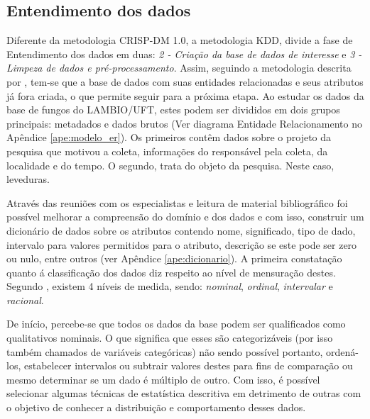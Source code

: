 \documentclass[tcc2]{classe_uftex/uftex}
\begin{document}
    \subsection{Entendimento dos dados}
    \label{subsec:entendimento_dados}
    Diferente da metodologia CRISP-DM 1.0, a metodologia KDD, divide a fase de Entendimento dos dados em duas: \emph{2 - Criação da base de dados de interesse} e \emph{3 - Limpeza de dados e pré-processamento}. Assim, seguindo a metodologia descrita por , tem-se que a base de dados com suas entidades relacionadas e seus atributos já fora criada, o que permite seguir para a próxima etapa. Ao estudar os dados da base de fungos do LAMBIO/UFT, estes podem ser divididos em dois grupos principais: metadados e dados brutos (Ver diagrama Entidade Relacionamento no Apêndice \ref{ape:modelo_er}). Os primeiros contêm dados sobre o projeto da pesquisa que motivou a coleta, informações do responsável pela coleta, da localidade e do tempo. O segundo, trata do objeto da pesquisa. Neste caso, leveduras.
     
     Através das reuniões com os especialistas e leitura de material bibliográfico foi possível melhorar a compreensão do domínio e dos dados e com isso, construir um dicionário de dados sobre os atributos contendo nome, significado, tipo de dado, intervalo para valores permitidos para o atributo, descrição se este pode ser zero ou nulo, entre outros (ver Apêndice \ref{ape:dicionario}). A primeira constatação quanto á classificação dos dados diz respeito ao nível de mensuração destes. Segundo , existem 4 níveis de medida, sendo: \emph{nominal}, \emph{ordinal}, \emph{intervalar} e \emph{racional}.
     
     De início, percebe-se que todos os dados da base podem ser qualificados como qualitativos nominais. O que significa que esses são categorizáveis (por isso também chamados de variáveis categóricas) não sendo possível portanto, ordená-los, estabelecer intervalos ou subtrair valores destes para fins de comparação ou mesmo determinar se um dado é múltiplo de outro. Com isso, é possível selecionar algumas técnicas de estatística descritiva em detrimento de outras com o objetivo de conhecer a distribuição e comportamento desses dados.
     
\end{document}
